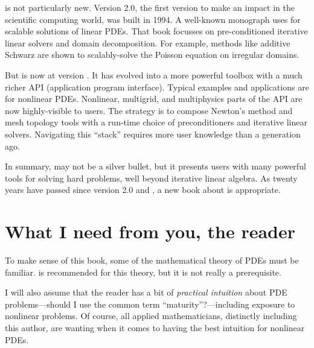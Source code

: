 \PETSc is not particularly new.  Version 2.0, the first version to make an impact in the scientific computing world, was built in 1994.  A well-known monograph \citet{Smithetal1996} uses  for scalable solutions of linear PDEs.  That book focusses on pre-conditioned iterative linear solvers and domain decomposition.  For example, methods like additive Schwarz are shown to scalably-solve the Poisson equation on irregular domains.

But \PETSc is now at version \PETSCVERSION.  It has evolved into a more powerful toolbox with a much richer API (application program interface).  Typical examples and applications are for nonlinear PDEs.  Nonlinear, multigrid, and multiphysics parts of the API are now highly-visible to users.  The \PETSc strategy is to compose Newton's method and mesh topology tools with a run-time choice of preconditioners and iterative linear solvers.  Navigating this ``stack'' requires more user knowledge than a generation ago.

In summary, \PETSc may not be a silver bullet, but it presents users with many powerful tools for solving hard problems, well beyond iterative linear algebra.  As twenty years have passed since version 2.0 and \citet{Smithetal1996}, a new book about \PETSc is appropriate.


\section{What I need from you, the reader}

To make sense of this book, some of the mathematical theory of PDEs must be familiar.  \citet{Evans2010} is recommended for this theory, but it is not really a prerequisite.

I will also assume that the reader has a bit of \emph{practical intuition} about PDE problems---should I use the common term ``maturity''?---including exposure to nonlinear problems.  Of course, all applied mathematicians, distinctly including this author, are wanting when it comes to having the best intuition for nonlinear PDEs.

